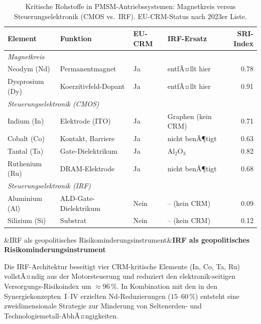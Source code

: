 ﻿\documentclass[12pt, a4paper]{report}
\newenvironment{ergebnis}[1][]{%
  \begin{ergebnisframe}\sloppy%
  \ifx&#1&\else\textbf{#1}\par\smallskip\fi}{\end{ergebnisframe}}
\theoremstyle{definition}
\theoremstyle{remark}
\begin{document}
\begin{table}[H]
  \centering
  \caption{Kritische Rohstoffe in PMSM-Antriebssystemen:
           Magnetkreis versus Steuerungselektronik
           (CMOS vs.\ IRF). EU-CRM-Status nach 2023er Liste.}
  \label{tab:crm_vergleich}
  \small
  \begin{tabular}{llllr}
    \toprule
    \textbf{Element} & \textbf{Funktion} & \textbf{EU-CRM} &
    \textbf{IRF-Ersatz} & \textbf{SRI-Index} \\
    \midrule
    \multicolumn{5}{l}{\textit{Magnetkreis}} \\
    Neodym (Nd)    & Permanentmagnet        & Ja  & entfÃ¤llt hier & 0.78 \\
    Dysprosium (Dy) & Koerzitivfeld-Dopant  & Ja  & entfÃ¤llt hier & 0.91 \\
    \midrule
    \multicolumn{5}{l}{\textit{Steuerungselektronik (CMOS)}} \\
    Indium (In)    & Elektrode (ITO)        & Ja  & Graphen (kein CRM) & 0.71 \\
    Cobalt (Co)    & Kontakt, Barriere      & Ja  & nicht benÃ¶tigt    & 0.63 \\
    Tantal (Ta)    & Gate-Dielektrikum      & Ja  & Al$_2$O$_3$       & 0.82 \\
    Ruthenium (Ru) & DRAM-Elektrode         & Ja  & nicht benÃ¶tigt    & 0.68 \\
    \midrule
    \multicolumn{5}{l}{\textit{Steuerungselektronik (IRF)}} \\
    Aluminium (Al) & ALD-Gate-Dielektrikum  & Nein  & -- (kein CRM) & 0.09 \\
    Silizium (Si)  & Substrat               & Nein  & -- (kein CRM) & 0.12 \\
    \bottomrule
  \end{tabular}
\end{table}

\begin{ergebnis}[IRF als geopolitisches Risikominderungsinstrument]
  Die IRF-Architektur beseitigt vier CRM-kritische Elemente
  (In, Co, Ta, Ru) vollstÃ¤ndig aus der Motorsteuerung und reduziert
  den elektronik-seitigen Versorgungs-Risikoindex um $\approx 96\,\%$.
  In Kombination mit den in den Synergiekonzepten~I--IV erzielten
  Nd-Reduzierungen ($15$--$60\,\%$) entsteht eine zweidimensionale
  Strategie zur Minderung von Seltenerden- und Technologiemetall-AbhÃ¤ngigkeiten.
\end{ergebnis}
\end{document}
